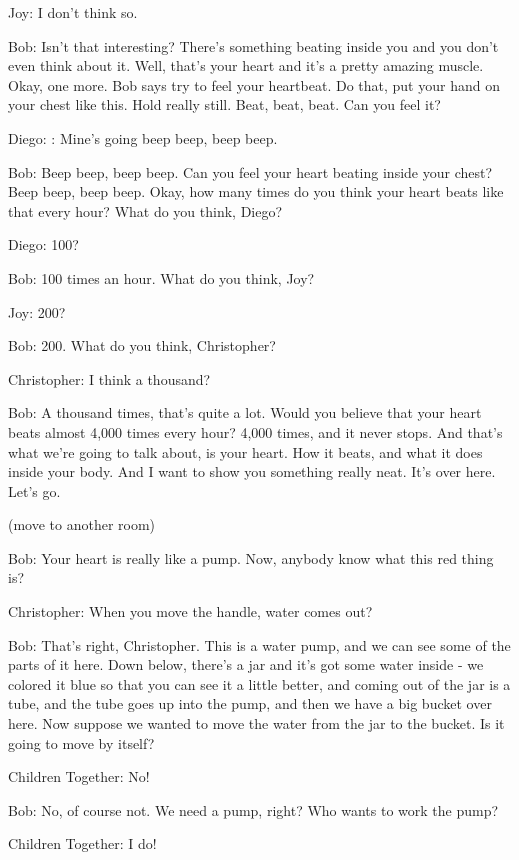 Joy: I don't think so.

Bob: Isn't that interesting? There's something beating inside you and you don't even think about it. Well, that's your heart and it's a pretty amazing muscle. Okay, one more. Bob says try to feel your heartbeat. Do that, put your hand on your chest like this. Hold really still. Beat, beat, beat. Can you feel it?

Diego: : Mine's going beep beep, beep beep.

Bob: Beep beep, beep beep. Can you feel your heart beating inside your chest? Beep beep, beep beep. Okay, how many times do you think your heart beats like that every hour? What do you think, Diego?

Diego: 100?

Bob: 100 times an hour. What do you think, Joy?

Joy: 200?

Bob: 200. What do you think, Christopher?

Christopher: I think a thousand?

Bob: A thousand times, that's quite a lot. Would you believe that your heart beats almost 4,000 times every hour? 4,000 times, and it never stops. And that's what we're going to talk about, is your heart. How it beats, and what it does inside your body. And I want to show you something really neat. It's over here. Let's go.

(move to another room)

Bob: Your heart is really like a pump. Now, anybody know what this red thing is?

Christopher: When you move the handle, water comes out?

Bob: That's right, Christopher. This is a water pump, and we can see some of the parts of it here. Down below, there's a jar and it's got some water inside - we colored it blue so that you can see it a little better, and coming out of the jar is a tube, and the tube goes up into the pump, and then we have a big bucket over here. Now suppose we wanted to move the water from the jar to the bucket. Is it going to move by itself?

Children Together: No!

Bob: No, of course not. We need a pump, right? Who wants to work the pump?

Children Together: I do!

